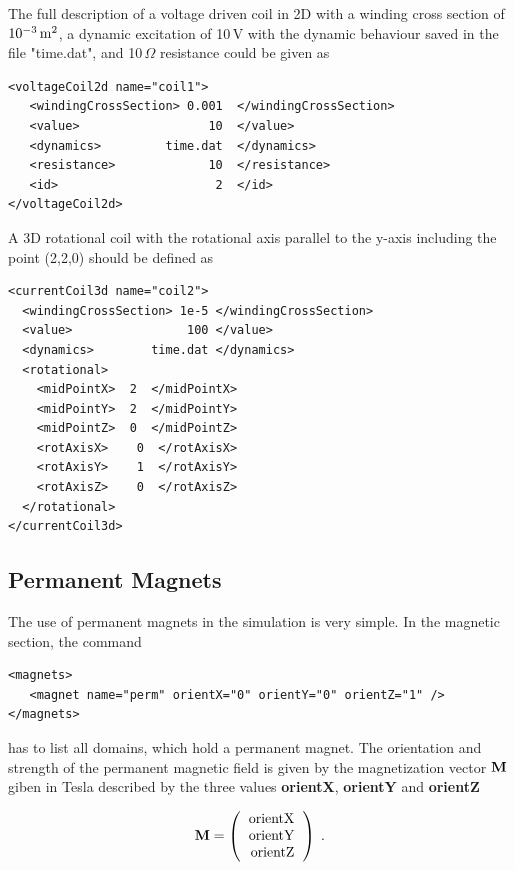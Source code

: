 The full description of a voltage driven coil in 2D with a winding
cross section of $10^{-3}\, \rm m^2$, a dynamic excitation of 10\,V with
the dynamic behaviour saved in the file "time.dat", 
and 10\,$\Omega$ resistance could be given as
\begin{verbatim}
<voltageCoil2d name="coil1">
   <windingCrossSection> 0.001  </windingCrossSection>
   <value>                  10  </value>
   <dynamics>         time.dat  </dynamics>
   <resistance>             10  </resistance>
   <id>                      2  </id>
</voltageCoil2d>
\end{verbatim}

A 3D rotational coil with the rotational axis parallel to the y-axis
including the point (2,2,0) should be defined as

\begin{verbatim}
<currentCoil3d name="coil2">
  <windingCrossSection> 1e-5 </windingCrossSection>
  <value>                100 </value>
  <dynamics>        time.dat </dynamics>
  <rotational>
    <midPointX>  2  </midPointX>
    <midPointY>  2  </midPointY>
    <midPointZ>  0  </midPointZ>
    <rotAxisX>    0  </rotAxisX>
    <rotAxisY>    1  </rotAxisY>
    <rotAxisZ>    0  </rotAxisZ>
  </rotational>
</currentCoil3d>
\end{verbatim}


\subsection{Permanent Magnets}
The use of permanent magnets in the simulation is very simple. In the
magnetic section, the command

\begin{verbatim}
<magnets>
   <magnet name="perm" orientX="0" orientY="0" orientZ="1" />
</magnets>
\end{verbatim}
has to list all domains, which hold a permanent magnet. The
orientation and strength of the permanent magnetic field is given by
the magnetization vector ${\bf M}$ giben in Tesla described by the three
values {\bf orientX}, {\bf orientY} and {\bf orientZ}

\begin{equation}
  \label{eq:M}
  \bM = \left(
    \begin{tabular}{r}
      orientX\\
      orientY\\
      orientZ
    \end{tabular}
\right) \; .
\end{equation}

